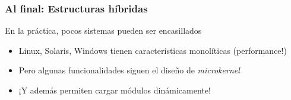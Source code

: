 \documentclass[letter]{beamer}
\begin{document}
\begin{frame}
  \frametitle{Al final: Estructuras híbridas}

  En la práctica, pocos sistemas pueden ser encasillados
  \begin{itemize}
    \item Linux, Solaris, Windows tienen características monolíticas (performance!)
    \item Pero algunas funcionalidades siguen el diseño de {\em microkernel}
    \item ¡Y además permiten cargar módulos dinámicamente!
  \end{itemize}

\end{frame}

%
%  
%

%
%
%
\end{document}
